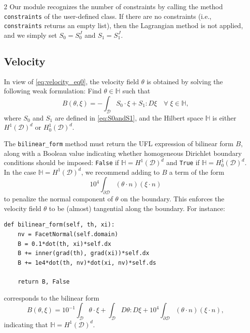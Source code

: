 \documentclass[a4paper, oneside]{article}
\newcommand{\code}[1]{\texttt{#1}}
\begin{document}
\begin{multicols}{2}
Our module recognizes the number of constraints by calling
the method \code{constraints} of the user-defined class.
If there are no constraints (i.e., \code{constraints} returns an empty list),
then the Lagrangian method is not applied, and we simply set
$S_0 = S_0^J$ and $S_1 = S_1^J$.

\subsection{Velocity}
\label{sub:velocity}

In view of \eqref{eq:velocity_eq0}, the velocity field $\theta$ is obtained by solving the following weak formulation:
Find $\theta\in\mathbb{H}$ such that
\begin{equation} \label{eq:velocity}
	B (\theta, \xi) =
	- \int_{\mathcal{D}} S_0\cdot\xi + S_1 : D\xi \quad\forall \; \xi \in \mathbb{H},
\end{equation}
where $S_0$ and $S_1$ are defined in \eqref{eq:S0andS1}, and
the Hilbert space $\mathbb{H}$ is either $H^1(\mathcal{D})^d$ or $H_0^1(\mathcal{D})^d$.

The \code{bilinear\_form} method must return 
the UFL expression of bilinear form $B$, along with
a Boolean value indicating whether homogeneous Dirichlet boundary conditions
should be imposed:
\code{False} if $\mathbb{H} = H^1(\mathcal{D})^d$ and
\code{True} if $\mathbb{H} = H_0^1(\mathcal{D})^d$.
In the case $\mathbb{H} = H^1(\mathcal{D})^d$,
we recommend adding to $B$ a term of the form
\begin{equation}\label{eq:bd_plt}
	{10}^4 \int_{\partial \mathcal{D}}  (\theta \cdot n) (\xi \cdot n)
\end{equation}
to penalize the normal component of $\theta$ on the boundary.
This enforces the velocity field $\theta$ to be
(almost) tangential along the boundary.
For instance:
\begin{lstlisting}
def bilinear_form(self, th, xi):
	nv = FacetNormal(self.domain)
	B = 0.1*dot(th, xi)*self.dx
	B += inner(grad(th), grad(xi))*self.dx
	B += 1e4*dot(th, nv)*dot(xi, nv)*self.ds

	return B, False	
\end{lstlisting}
corresponds to the bilinear form
\begin{equation*}
B(\theta, \xi) =  {10}^{-1} \int_{\mathcal{D}} \theta \cdot \xi + 
	\int_{\mathcal{D}} D\theta : D\xi +
	{10}^4 \int_{\partial \mathcal{D}}  (\theta \cdot n) (\xi \cdot n),	
\end{equation*}
indicating that $\mathbb{H} = H^1(\mathcal{D})^d$.


\end{multicols}
\end{document}
